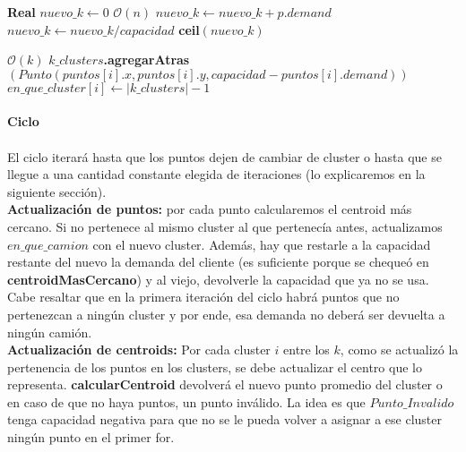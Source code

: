 \begin{algorithm}[H]
	\caption{\Comment $\mathcal{O}(n)$}
	\label{calcular-k}
	\begin{algorithmic}[1]
		\State \textbf{Real } $nuevo\_k \gets 0$
		 \Comment $\mathcal{O}(n)$
		\State $nuevo\_k \gets nuevo\_k + p.demand$
		\EndFor
		\State $nuevo\_k \gets nuevo\_k/capacidad$ 
		\State \Return \textbf{ceil}$(nuevo\_k)$
		\EndFunction
	\end{algorithmic}
\end{algorithm}

\begin{algorithm}[H]
	\caption{\Comment $\mathcal{O}(k)$}
	\label{inicializar-clusters}
	\begin{algorithmic}[1]
		 \Comment $\mathcal{O}(k)$
		\State $k\_clusters$\textbf{.agregarAtras}$(Punto(puntos[i].x, puntos[i].y, capacidad - puntos[i].demand))$
		\State $en\_que\_cluster[i] \gets |k\_clusters|-1$
		\EndFor
		\EndFunction
	\end{algorithmic}
\end{algorithm}


\paragraph{Ciclo}
\paragraph{}
El ciclo iterará hasta que los puntos dejen de cambiar de cluster o hasta que se llegue a una cantidad constante elegida de iteraciones (lo explicaremos en la siguiente sección).\hspace{0pt} \\
\indent \textbf{Actualización de puntos:} por cada punto calcularemos el centroid más cercano. Si no pertenece al mismo cluster al que pertenecía antes, actualizamos $en\_que\_camion$ con el nuevo cluster. Además, hay que restarle a la capacidad restante del nuevo la demanda del cliente (es suficiente porque se chequeó en \textbf{centroidMasCercano}) y al viejo, devolverle la capacidad que ya no se usa. Cabe resaltar que en la primera iteración del ciclo habrá puntos que no pertenezcan a ningún cluster y por ende, esa demanda no deberá ser devuelta a ningún camión.\hspace{0pt} \\
\indent \textbf{Actualización de centroids:} Por cada cluster $i$ entre los $k$, como se actualizó la pertenencia de los puntos en los clusters, se debe actualizar el centro que lo representa.  \textbf{calcularCentroid} devolverá el nuevo punto promedio del cluster o en caso de que no haya puntos, un punto inválido. La idea es que $Punto\_Invalido$ tenga capacidad negativa para que no se le pueda volver a asignar a ese cluster ningún punto en el primer for.

